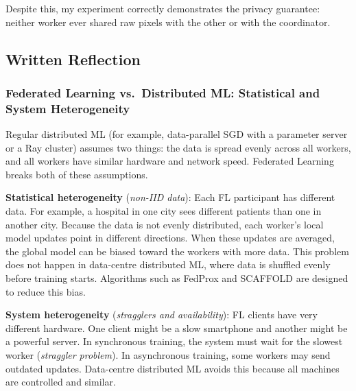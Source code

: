 \documentclass[11pt,a4paper]{article}
\begin{document}
Despite this, my experiment correctly demonstrates the privacy guarantee: neither
worker ever shared raw pixels with the other or with the coordinator.

\subsection{Written Reflection}

\subsubsection{Federated Learning vs.\ Distributed ML: Statistical and System
               Heterogeneity}

Regular distributed ML (for example, data-parallel SGD with a parameter server or a Ray
cluster) assumes two things: the data is spread evenly across all workers, and all
workers have similar hardware and network speed. Federated Learning breaks both of these
assumptions.

\textbf{Statistical heterogeneity} (\emph{non-IID data}): Each FL participant has
different data. For example, a hospital in one city sees different patients than one in
another city. Because the data is not evenly distributed, each worker's local model
updates point in different directions. When these updates are averaged, the global model
can be biased toward the workers with more data. This problem does not happen in
data-centre distributed ML, where data is shuffled evenly before training starts.
Algorithms such as FedProx and SCAFFOLD are designed to reduce this bias.

\textbf{System heterogeneity} (\emph{stragglers and availability}): FL clients have
very different hardware. One client might be a slow smartphone and another might be a
powerful server. In synchronous training, the system must wait for the slowest worker
(\emph{straggler problem}). In asynchronous training, some workers may send outdated
updates. Data-centre distributed ML avoids this because all machines are controlled and
similar.
\end{document}
